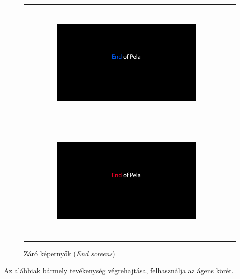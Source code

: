 \begin{figure}[h!]
    \begin{center}
        \begin{tabular}{ cc }
            \includegraphics[width=0.70\textwidth, height=60mm]{images/endscreenblue.png}
            \\ 
            \includegraphics[width=0.70\textwidth, height=60mm]{images/endscreenred.png}  
            \\
        \end{tabular}
        \caption{Záró képernyők (\textit{End screens})}
        \label{tbl:tableofendscreens}
    \end{center}
\end{figure}


Az alábbiak bármely tevékenység végrehajtása, felhasználja az ágens körét.

